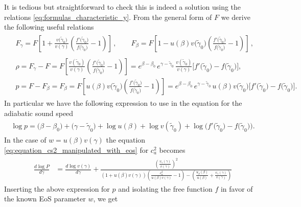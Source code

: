 It is tedious but straightforward to check this is indeed a solution using the relations \eqref{eq:formulas_characteristic_y}.
From the general form of $F$ we derive the following useful relations
{\small\begin{align}
\begin{aligned}
    &F_\gamma = F\left[1+\frac{v\big(\tilde{\gamma}_0\big)}{v(\gamma)}\left(\frac{f'\big(\tilde{\gamma}_0\big)}{f\big(\tilde{\gamma}_0\big)}-1\right)\right]\,,\qquad
    F_\beta=F\left[1-u(\beta)v\big(\tilde{\gamma}_0\big)\left(\frac{f'\big(\tilde{\gamma}_0\big)}{f\big(\tilde{\gamma}_0\big)}-1\right)\right]\,,\\
    \\
    &\rho=F_\gamma-F = F\left[\tfrac{v(\tilde{\gamma}_0)}{v(\gamma)}\left(\frac{f'\big(\tilde{\gamma}_0\big)}{f\big(\tilde{\gamma}_0\big)}-1\right)\right]=e^{\beta-\beta_0}\, e^{\gamma-\tilde{\gamma}_0}\,\tfrac{v(\tilde{\gamma}_0)}{v(\gamma)}\Big[f'\big(\tilde{\gamma}_0\big)-f\big(\tilde{\gamma}_0\big)\Big],\\
    &p=F-F_\beta= F_\beta=F\left[u(\beta)v\big(\tilde{\gamma}_0\big)\left(\frac{f'\big(\tilde{\gamma}_0\big)}{f\big(\tilde{\gamma}_0\big)}-1\right)\right]=
    e^{\beta-\beta_0}\, e^{\gamma-\tilde{\gamma}_0}\,u(\beta)v\big(\tilde{\gamma}_0\big)\Big[f'\big(\tilde{\gamma}_0\big)-f\big(\tilde{\gamma}_0\big)\Big].
\end{aligned}\end{align}}
In particular we have the following expression to use in the equation for the adiabatic sound speed
{\small\begin{align}
\begin{aligned}
    \log p=\big(\beta-\beta_0\big)+\big(\gamma-\tilde{\gamma}_0\big)+\log u(\beta)+\log v(\tilde{\gamma}_0)+\log\Big(f'\big(\tilde{\gamma}_0\big)-f\big(\tilde{\gamma}_0\big)\Big).
\end{aligned}\end{align}}
In the case of $w=u(\beta)v(\gamma)$ the equation \eqref{eq:equation_cs2_manipulated_with_eos} for $c_a^2$ becomes 
{\small\begin{align}
\begin{aligned}
\frac{d\log P}{d\gamma}&= \frac{d\log v(\gamma)}{d\gamma} + \frac{\left(\tfrac{v_\gamma(\gamma)}{v(\gamma)}\right)^2}{(1+u(\beta)v(\gamma))\left(\frac{c_a^2}{u(\beta)v(\gamma)}-1\right)-\left(\tfrac{u_\beta(\beta)}{u(\beta)}+\tfrac{v_\gamma(\gamma)}{v(\gamma)}\right)}
\end{aligned}\end{align}}
Inserting the above expression for $p$ and isolating the free function $f$ in favor of the known EoS parameter $w$, we get
